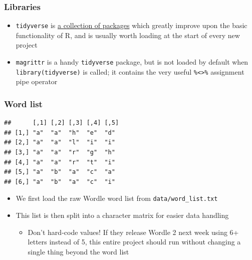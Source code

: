 \documentclass[
]{article}
\newenvironment{Shaded}{\begin{snugshade}}{\end{snugshade}}
\newcommand{\FunctionTok}[1]{\textcolor[rgb]{0.00,0.00,0.00}{#1}}
\newcommand{\NormalTok}[1]{#1}
\newcommand{\SpecialCharTok}[1]{\textcolor[rgb]{0.00,0.00,0.00}{#1}}
\newcommand{\StringTok}[1]{\textcolor[rgb]{0.31,0.60,0.02}{#1}}
\providecommand{\tightlist}{%
  \setlength{\itemsep}{0pt}\setlength{\parskip}{0pt}}
\begin{document}
\hypertarget{libraries}{%
\subsubsection{Libraries}\label{libraries}}

\begin{itemize}
\item
  \texttt{tidyverse} is \href{https://www.tidyverse.org/packages/}{a
  collection of packages} which greatly improve upon the basic
  functionality of R, and is usually worth loading at the start of every
  new project
\item
  \texttt{magrittr} is a handy \texttt{tidyverse} package, but is not
  loaded by default when
  \texttt{library(\textquotesingle{}tidyverse\textquotesingle{})} is
  called; it contains the very useful
  \texttt{\%\textless{}\textgreater{}\%} assignment pipe operator
\end{itemize}

\hypertarget{word-list}{%
\subsubsection{Word list}\label{word-list}}

\begin{Shaded}
\end{Shaded}

\begin{verbatim}
##      [,1] [,2] [,3] [,4] [,5]
## [1,] "a"  "a"  "h"  "e"  "d" 
## [2,] "a"  "a"  "l"  "i"  "i" 
## [3,] "a"  "a"  "r"  "g"  "h" 
## [4,] "a"  "a"  "r"  "t"  "i" 
## [5,] "a"  "b"  "a"  "c"  "a" 
## [6,] "a"  "b"  "a"  "c"  "i"
\end{verbatim}

\begin{itemize}
\item
  We first load the raw Wordle word list from
  \texttt{data/word\_list.txt}
\item
  This list is then split into a character matrix for easier data
  handling

  \begin{itemize}
  \tightlist
  \item
    Don't hard-code values! If they release Wordle 2 next week using 6+
    letters instead of 5, this entire project should run without
    changing a single thing beyond the word list
  \end{itemize}
\end{itemize}
\end{document}
